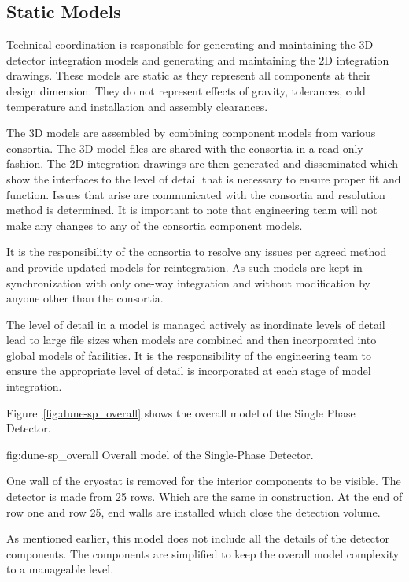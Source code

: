 \subsection{Static Models}
\label{sec:fdsp-coord-integ-static}
Technical coordination is responsible for generating and maintaining
the 3D detector integration models and generating and maintaining the
2D integration drawings. These models are static as they represent all
components at their design dimension. They do not represent effects of
gravity, tolerances, cold temperature and installation and assembly
clearances.

The 3D models are assembled by combining component models from various
consortia. The 3D model files are shared with the consortia in a
read-only fashion. The 2D integration drawings are then generated and
disseminated which show the interfaces to the level of detail that is
necessary to ensure proper fit and function. Issues that arise are
communicated with the consortia and resolution method is
determined. It is important to note that  engineering team
will not make any changes to any of the consortia component models.

It is the responsibility of the consortia to resolve any issues per
agreed method and provide updated models for reintegration. As such
models are kept in synchronization with only one-way integration and
without modification by anyone other than the consortia.

The level of detail in a model is managed actively as inordinate
levels of detail lead to large file sizes when models are combined and
then incorporated into global models of facilities. It is the
responsibility of the  engineering team to ensure the
appropriate level of detail is incorporated at each stage of model
integration.

Figure~\ref{fig:dune-sp_overall} shows the overall model of the Single Phase Detector.
\begin{dunefigure}{fig:dune-sp_overall}
  {Overall model of the Single-Phase Detector.}
\end{dunefigure}
One wall of the cryostat is removed for the interior components to be
visible. The detector is made from 25 rows. Which are the same in
construction. At the end of row one and row 25, end walls are
installed which close the detection volume.

As mentioned earlier, this model does not include all the details of
the detector components. The components are simplified to keep the
overall model complexity to a manageable level.

